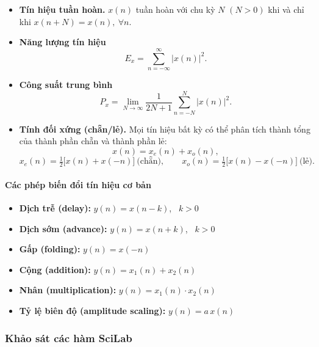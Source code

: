 \documentclass[12pt,a4paper]{article}
\begin{document}
\begin{itemize}[leftmargin=1.2em]
  \item \textbf{Tín hiệu tuần hoàn.} $x(n)$ tuần hoàn với chu kỳ $N$ $(N>0)$ khi và
  chỉ khi $x(n+N) = x(n),\ \forall n$.

  \item \textbf{Năng lượng tín hiệu}
  \[
    E_x = \sum_{n=-\infty}^{\infty} |x(n)|^2 .
  \]

  \item \textbf{Công suất trung bình}
  \[
    P_x = \lim_{N\to\infty}\frac{1}{2N+1}\sum_{n=-N}^{N} |x(n)|^2 .
  \]

  \item \textbf{Tính đối xứng (chẵn/lẻ).} Mọi tín hiệu bất kỳ có thể phân tích
  thành tổng của thành phần chẵn và thành phần lẻ:
  \[
    x(n) = x_e(n) + x_o(n),
  \]
  \[
    x_e(n) = \tfrac{1}{2}\big[x(n)+x(-n)\big] \ \text{(chẵn)}, \qquad
    x_o(n) = \tfrac{1}{2}\big[x(n)-x(-n)\big] \ \text{(lẻ)}.
  \]
\end{itemize}

\paragraph{Các phép biến đổi tín hiệu cơ bản}

\begin{itemize}[leftmargin=1.2em]
  \item \textbf{Dịch trễ (delay):} $y(n) = x(n-k)$, \ $k>0$
  \item \textbf{Dịch sớm (advance):} $y(n) = x(n+k)$, \ $k>0$
  \item \textbf{Gấp (folding):} $y(n) = x(-n)$
  \item \textbf{Cộng (addition):} $y(n) = x_1(n) + x_2(n)$
  \item \textbf{Nhân (multiplication):} $y(n) = x_1(n)\cdot x_2(n)$
  \item \textbf{Tỷ lệ biên độ (amplitude scaling):} $y(n) = a\,x(n)$
\end{itemize}

\subsubsection{Khảo sát các hàm SciLab}
\end{document}
